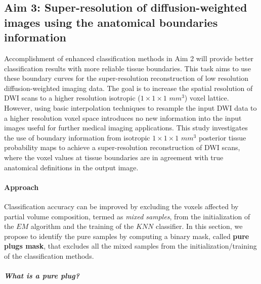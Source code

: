 \subsection{Aim 3: Super-resolution of diffusion-weighted images using the anatomical boundaries information}
Accomplishment of enhanced classification methods in Aim 2 will provide better classification results with more reliable tissue boundaries. This task aims to use these boundary curves for the super-resolution reconstruction of low resolution diffusion-weighted imaging data.
The goal is to increase the spatial resolution of DWI scans to a higher resolution isotropic ($1\times1\times1$ $mm^3$) voxel lattice. However, using basic interpolation techniques to resample the input DWI data to a higher resolution voxel space introduces no new information into the input images useful for further medical imaging applications. This study investigates the use of boundary information from isotropic $1\times1\times1$ $mm^3$ posterior tissue probability maps to achieve a super-resolution reconstruction of DWI scans, where the voxel values at tissue boundaries are in agreement with true anatomical definitions in the output image.
\newline









\paragraph{Approach} %

Classification accuracy can be improved by excluding the voxels affected by partial volume composition, termed as \textit{mixed samples}, from the initialization of the $EM$ algorithm and the training of the $KNN$ classifier.
In this section, we propose to identify the pure samples by computing a binary mask, called \textbf{pure plugs mask}, that excludes all the mixed samples from the initialization/training of the classification methods.

\subparagraph{What is a pure plug?}
\label{section:purePlugDef}

